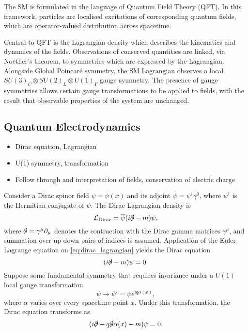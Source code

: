 The SM is formulated in the language of Quantum Field Theory (QFT).
In this framework, particles are localised excitations of corresponding quantum fields, which are operator-valued distribution across spacetime.

Central to QFT is the Lagrangian density which describes the kinematics and dynamics of the fields.
Observations of conserved quantities are linked, via Noether's theorem, to symmetries which are expressed by the Lagrangian.
Alongside Global Poincar\'e symmetry, the SM Lagrangian observes a local $SU(3)_C \otimes SU(2)_L \otimes U(1)_Y$ gauge symmetry.
The presence of gauge symmetries allows certain gauge transformations to be applied to fields, with the result that observable properties of the system are unchanged.



\subsection{Quantum Electrodynamics}\label{sec:qed}

\begin{itemize}
  \item Dirac equation, Lagrangian
  \item U(1) symmetry, transformation
  \item Follow through and interpretation of fields, conservation of electric charge
\end{itemize}

Consider a Dirac spinor field $\psi = \psi(x)$ and its adjoint $\overline{\psi} = \psi^\dagger \gamma^0$, where $\psi^\dagger$ is the Hermitian conjugate of $\psi$.
The Dirac Lagrangian density is
%
\begin{equation}\label{eq:dirac_lagrangian}
  \mathcal{L}_{\textnormal{Dirac}} = \overline{\psi} (i \slashed{\partial}  - m )\psi,
\end{equation}
%
where $\slashed{\partial} = \gamma^\mu \partial_\mu$ denotes the contraction with the Dirac gamma matrices $\gamma^\mu$, and summation over up-down pairs of indices is assumed.
Application of the Euler-Lagrange equation on \cref{eq:dirac_lagrangian} yields the Dirac equation
%
\begin{equation}\label{eq:dirac_eq}
  (i \slashed{\partial}  - m )\psi = 0.
\end{equation}
%
Suppose some fundamental symmetry that requires invariance under a $U(1)$ local gauge transformation
%
\begin{equation}\label{eq:U(1)_transformation}
  \psi \rightarrow \psi' = \psi e^{i q \alpha(x)} ,
\end{equation}
%
where $\alpha$ varies over every spacetime point $x$.
Under this transformation, the Dirac equation transforms as 
%
\begin{equation}\label{eq:dirac_eq_transformed}
  (i \slashed{\partial} - q\slashed{\partial}\alpha(x) - m )\psi = 0.
\end{equation}
%


